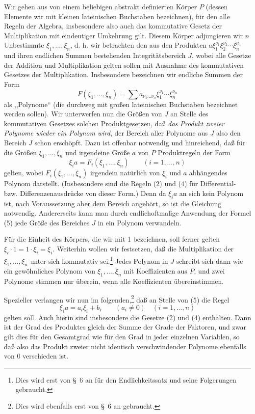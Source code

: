\documentclass[11pt]{article}
\begin{document}
Wir gehen aus von einem beliebigen abstrakt definierten Körper $P$ (dessen Elemente wir mit kleinen lateinischen Buchstaben bezeichnen), für den alle Regeln der Algebra, insbesondere also auch das kommutative Gesetz der Multiplikation mit eindeutiger Umkehrung gilt. Diesem Körper adjungieren wir $n$ Unbestimmte $\xi_1,\ldots,\xi_n$, d. h. wir betrachten den aus den Produkten $a\xi_1^{\nu_1}\xi_2^{\nu_2}\cdots\xi_n^{\nu_n}$ und ihren endlichen Summen bestehenden Integritätsbereich $J$, wobei alle Gesetze der Addition und Multiplikation gelten sollen mit Ausnahme des kommutativen Gesetzes der Multiplikation. Insbesondere bezeichnen wir endliche Summen der Form
\[
 F(\xi_1,\ldots,\xi_n)=\sum a_{\nu_1\ldots\nu_n}\xi_1^{\nu_1}\cdots\xi_n^{\nu_n}
\]
als ,,Polynome`` (die durchweg mit großen lateinischen Buchstaben bezeichnet werden sollen). Wir unterwerfen nun die Größen von $J$ an Stelle des kommutativen Gesetzes solchen Produktgesetzen, daß \emph{das Produkt zweier Polynome wieder ein Polynom wird}, der Bereich aller Polynome aus $J$ also den Bereich $J$ schon erschöpft. Dazu ist offenbar notwendig und hinreichend, daß für die Größen $\xi_1,\ldots,\xi_n$ und irgendeine Größe $a$ von $P$ Produktregeln der Form
\begin{equation}
 \xi_i a=F_i(\xi_1,\ldots,\xi_n)\qquad (i=1,\ldots,n)
\tag{5}
\end{equation}
gelten, wobei $F_i(\xi_1,\ldots,\xi_n)$ irgendein natürlich von $\xi_i$ und $a$ abhängendes Polynom darstellt. (Insbesondere sind die Regeln (2) und (4) für Differential- bzw. Differenzenausdrücke von dieser Form.) Denn da $\xi_i a$ an sich kein Polynom ist, nach Voraussetzung aber dem Bereich angehört, so ist die Gleichung notwendig. Andererseits kann man durch endlichoftmalige Anwendung der Formel (5) jede Größe des Bereiches $J$ in ein Polynom verwandeln.

Für die Einheit des Körpers, die wir mit 1 bezeichnen, soll ferner gelten $\xi_i\cdot1=1\cdot\xi_i=\xi_i$. Weiterhin wollen wir festsetzen, daß die Multiplikation der $\xi_1,\ldots,\xi_n$ unter sich kommutativ sei.\footnote{Dies wird erst von \S~6 an für den Endlichkeitssatz und seine Folgerungen gebraucht.} Jedes Polynom in $J$ schreibt sich dann wie ein gewöhnliches Polynom von $\xi_1,\ldots,\xi_n$ mit Koeffizienten aus $P$, und zwei Polynome stimmen nur überein, wenn alle Koeffizienten übereinstimmen.

Spezieller verlangen wir nun im folgenden,\footnote{Dies wird ebenfalls erst von \S~6 an gebraucht.} daß an Stelle von (5) die Regel
\begin{equation}
 \xi_i a=a_i\xi_i+b_i\qquad (a_i\ne0)\quad(i=1,\ldots,n)
\tag{6}
\end{equation}
gelten soll. Auch hierin sind insbesondere die Gesetze (2) und (4) enthalten. Dann ist der Grad des Produktes gleich der Summe der Grade der Faktoren, und zwar gilt dies für den Gesamtgrad wie für den Grad in jeder einzelnen Variablen, so daß also das Produkt zweier nicht identisch verschwindender Polynome ebenfalls von 0 verschieden ist.
\end{document}
